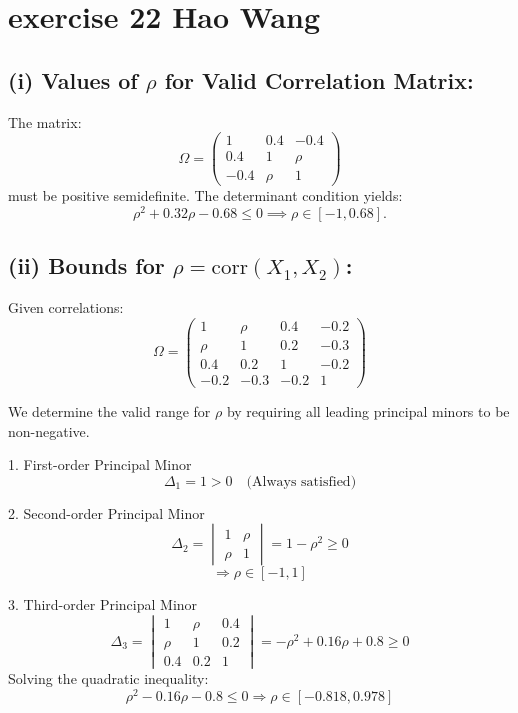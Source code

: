 \documentclass{article}
\begin{document}
\section{exercise 22 Hao Wang}

\subsection*{(i) Values of \(\rho\) for Valid Correlation Matrix:}

The matrix:
\[
\Omega = \begin{pmatrix}
1 & 0.4 & -0.4 \\
0.4 & 1 & \rho \\
-0.4 & \rho & 1
\end{pmatrix}
\]
must be positive semidefinite. The determinant condition yields:
\[
\rho^2 + 0.32\rho - 0.68 \leq 0 \implies \rho \in [-1, 0.68].
\]

\subsection*{(ii) Bounds for \(\rho = \text{corr}(X_1, X_2)\):}

Given correlations:
\[
\Omega = \begin{pmatrix}
1 & \rho & 0.4 & -0.2 \\
\rho & 1 & 0.2 & -0.3 \\
0.4 & 0.2 & 1 & -0.2 \\
-0.2 & -0.3 & -0.2 & 1
\end{pmatrix}
\]

We determine the valid range for $\rho$ by requiring all leading principal minors to be non-negative.

1. First-order Principal Minor
\[
\Delta_1 = 1 > 0 \quad \text{(Always satisfied)}
\]

2. Second-order Principal Minor
\[
\Delta_2 = \begin{vmatrix}
1 & \rho \\
\rho & 1 
\end{vmatrix} = 1 - \rho^2 \geq 0
\]
\[
\Rightarrow \rho \in [-1, 1]
\]

3. Third-order Principal Minor
\[
\Delta_3 = \begin{vmatrix}
1 & \rho & 0.4 \\
\rho & 1 & 0.2 \\
0.4 & 0.2 & 1
\end{vmatrix} 
= -\rho^2 + 0.16\rho + 0.8 \geq 0
\]
Solving the quadratic inequality:
\[
\rho^2 - 0.16\rho - 0.8 \leq 0 \Rightarrow \rho \in [-0.818, 0.978]
\]
\end{document}
